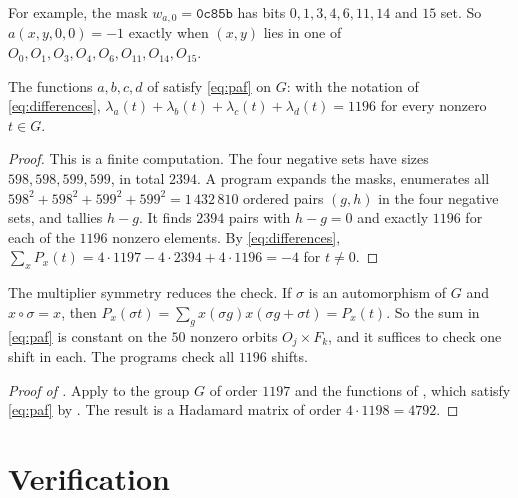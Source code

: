 \documentclass[11pt,colorlinks]{charlie}
\begin{document}
For example, the mask $w_{a,0}=\texttt{0c85b}$ has bits $0,1,3,4,6,11,14$ and $15$ set. So $a(x,y,0,0)=-1$ exactly when $(x,y)$ lies in one of $O_0,O_1,O_3,O_4,O_6,O_{11},O_{14},O_{15}$.

\begin{lemma}\label{lem:paf}
The functions $a,b,c,d$ of  satisfy \eqref{eq:paf} on $G$: with the notation of \eqref{eq:differences}, $\lambda_a(t)+\lambda_b(t)+\lambda_c(t)+\lambda_d(t)=1196$ for every nonzero $t\in G$.
\end{lemma}

\begin{proof}
This is a finite computation. The four negative sets have sizes $598,598,599,599$, in total $2394$. A program expands the masks, enumerates all $598^2+598^2+599^2+599^2=1\,432\,810$ ordered pairs $(g,h)$ in the four negative sets, and tallies $h-g$. It finds $2394$ pairs with $h-g=0$ and exactly $1196$ for each of the $1196$ nonzero elements. By \eqref{eq:differences}, $\sum_xP_x(t)=4\cdot1197-4\cdot2394+4\cdot1196=-4$ for $t\ne0$.
\end{proof}

The multiplier symmetry reduces the check. If $\sigma$ is an automorphism of $G$ and $x\circ\sigma=x$, then $P_x(\sigma t)=\sum_gx(\sigma g)x(\sigma g+\sigma t)=P_x(t)$. So the sum in \eqref{eq:paf} is constant on the $50$ nonzero orbits $O_j\times F_k$, and it suffices to check one shift in each. The programs check all $1196$ shifts.

\begin{proof}[Proof of ]
Apply  to the group $G$ of order $1197$ and the functions of , which satisfy \eqref{eq:paf} by . The result is a Hadamard matrix of order $4\cdot1198=4792$.
\end{proof}

\section{Verification}\label{sec:verification}
\end{document}
